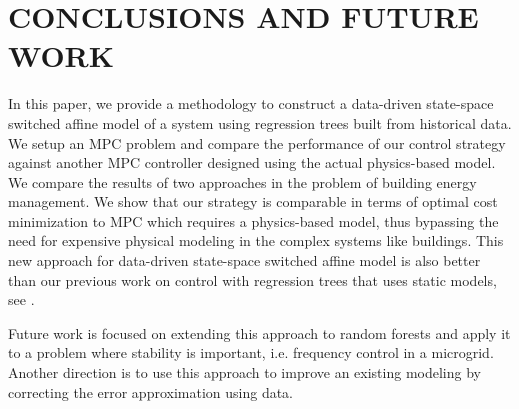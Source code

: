 \documentclass[letterpaper, 10 pt, conference]{ifacconf}  %
\begin{document}

\section{CONCLUSIONS AND FUTURE WORK}\label{secConclusion}
In this paper, we provide a methodology to construct a data-driven state-space switched affine model of a system using regression trees built from historical data.
We setup an MPC problem and compare the performance of our control strategy against another MPC controller designed using the actual physics-based model.
We compare the results of two approaches in the problem of building energy management.
We show that our strategy is comparable in terms of optimal cost minimization to MPC which requires a physics-based model, thus bypassing the need for expensive physical modeling in the complex systems like buildings. 
This new approach for data-driven state-space switched affine model is also better than our previous work on control with regression trees that uses static models, see \cite{JainACC2017}.

Future work is focused on extending this approach to random forests and apply it to a problem where stability is important, i.e. frequency control in a microgrid. Another direction is to use this approach to improve an existing modeling by correcting the error approximation using data.



\end{document}
